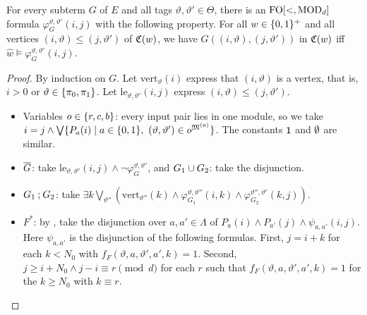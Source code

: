 \begin{lemma}[Translation]\label{lemma: translation}
  For every subterm $G$ of $E$ and all tags $\vartheta, \vartheta' \in \Theta$, there is an $\mathrm{FO}[<, \mathrm{MOD}_{d}]$ formula $\varphi^{\vartheta, \vartheta'}_{G}(i, j)$ with the following property.
  For all $w \in \{0,1\}^{+}$ and all vertices $(i, \vartheta) \le (j, \vartheta')$ of $\mathfrak{C}(w)$, we have $G((i, \vartheta), (j, \vartheta'))$ in $\mathfrak{C}(w)$ iff $\hat w \models \varphi^{\vartheta, \vartheta'}_{G}(i, j)$.
\end{lemma}
\begin{proof}
  By induction on $G$.
  Let $\mathrm{vert}_{\vartheta}(i)$ express that $(i, \vartheta)$ is a vertex, that is, $i > 0$ or $\vartheta \in \{\pi_0, \pi_1\}$.
  Let $\mathrm{le}_{\vartheta,\vartheta'}(i, j)$ express $(i, \vartheta) \le (j, \vartheta')$.
  \begin{itemize}
    \item Variables $o \in \{r, c, b\}$: every input pair lies in one module, so we take $i = j \wedge \bigvee \{P_a(i) \mid a \in \{0,1\},\ (\vartheta, \vartheta') \in o^{\mathfrak{M}^{(a)}}\}$.
          The constants $\mathsf{1}$ and $\emptyset$ are similar.
    \item $\overline{G}$: take $\mathrm{le}_{\vartheta,\vartheta'}(i, j) \wedge \neg\varphi^{\vartheta, \vartheta'}_{G}$, and $G_1 \cup G_2$: take the disjunction.
    \item $G_1 \mathbin{;} G_2$: take $\exists k \bigvee_{\vartheta''} (\mathrm{vert}_{\vartheta''}(k) \wedge \varphi^{\vartheta, \vartheta''}_{G_1}(i, k) \wedge \varphi^{\vartheta'', \vartheta'}_{G_2}(k, j))$.
    \item $F^{*}$: by , take the disjunction over $a, a' \in \Lambda$ of $P_a(i) \wedge P_{a'}(j) \wedge \psi_{a, a'}(i, j)$.
          Here $\psi_{a, a'}$ is the disjunction of the following formulas.
          First, $j = i + k$ for each $k < N_0$ with $f_F(\vartheta, a, \vartheta', a', k) = 1$.
          Second, $j \ge i + N_0 \wedge j - i \equiv r \pmod d$ for each $r$ such that $f_F(\vartheta, a, \vartheta', a', k) = 1$ for the $k \ge N_0$ with $k \equiv r$.
          \qedhere
  \end{itemize}
\end{proof}

